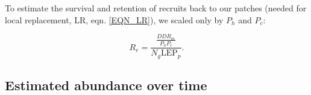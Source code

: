 \documentclass[12pt, oneside]{article}   	%
\begin{document}
To estimate the survival and retention of recruits back to our patches (needed for local replacement, LR, eqn. \ref{EQN_LR}), we scaled only by $P_h$ and $P_c$: 

\begin{equation}
R_e = \frac{\frac{DD R_m}{P_h P_c}}{N_g \text{LEP}_p}. \label{EQN_Re}
\end{equation}




\subsection*{Estimated abundance over time} %
\end{document}
